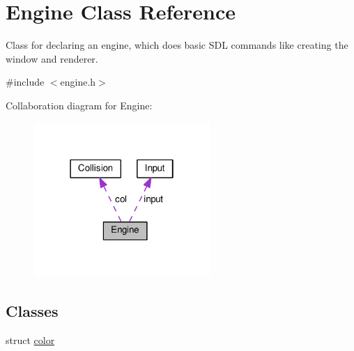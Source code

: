 \hypertarget{classEngine}{}\section{Engine Class Reference}
\label{classEngine}


Class for declaring an engine, which does basic S\+DL commands like creating the window and renderer.  




{\ttfamily \#include $<$engine.\+h$>$}



Collaboration diagram for Engine\+:
\nopagebreak
\begin{figure}[H]
\begin{center}
\leavevmode
\includegraphics[width=190pt]{classEngine__coll__graph}
\end{center}
\end{figure}
\subsection*{Classes}
\begin{DoxyCompactItemize}
\item 
struct \hyperlink{structEngine_1_1color}{color}
\end{DoxyCompactItemize}
